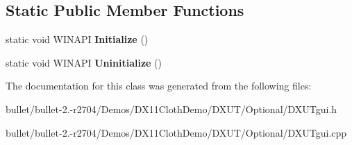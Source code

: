 \subsection*{Static Public Member Functions}
\begin{DoxyCompactItemize}
\item 
\hypertarget{class_c_uni_buffer_a05f3f1bcd1444d9e5ae974f9d83fe5f8}{static void W\+I\+N\+A\+P\+I {\bfseries Initialize} ()}\label{class_c_uni_buffer_a05f3f1bcd1444d9e5ae974f9d83fe5f8}

\item 
\hypertarget{class_c_uni_buffer_a6c35e6bd8c80ef44836b228bd07a17c4}{static void W\+I\+N\+A\+P\+I {\bfseries Uninitialize} ()}\label{class_c_uni_buffer_a6c35e6bd8c80ef44836b228bd07a17c4}

\end{DoxyCompactItemize}


The documentation for this class was generated from the following files\+:\begin{DoxyCompactItemize}
\item 
bullet/bullet-\/2.-\/r2704/\+Demos/\+D\+X11\+Cloth\+Demo/\+D\+X\+U\+T/\+Optional/D\+X\+U\+Tgui.\+h\item 
bullet/bullet-\/2.-\/r2704/\+Demos/\+D\+X11\+Cloth\+Demo/\+D\+X\+U\+T/\+Optional/D\+X\+U\+Tgui.\+cpp\end{DoxyCompactItemize}
